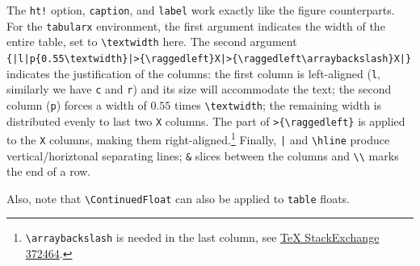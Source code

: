 The \verb|ht!| option, \verb|caption|, and \verb|label| work exactly like the figure counterparts. For the \verb|tabularx| environment, the first argument indicates the width of the entire table, set to \texttt{\textbackslash textwidth} here. The second argument \texttt{\{|l|p\{0.55\textbackslash textwidth\allowbreak\}|>\{\textbackslash raggedleft\}X|>\{\textbackslash raggedleft\textbackslash arraybackslash\}X|\}} indicates the justification of the columns: the first column is left-aligned (\verb|l|, similarly we have \verb|c| and \verb|r|) and its size will accommodate the text; the second column (\verb|p|) forces a width of $0.55$ times \texttt{\textbackslash textwidth}; the remaining width is distributed evenly to last two \verb|X| columns. The part of \texttt{>\{\textbackslash raggedleft\}} is applied to the \verb|X| columns, making them right-aligned.\footnote{\texttt{\textbackslash arraybackslash} is needed in the last column, see \href{https://tex.stackexchange.com/questions/372464/last-tabularx-column-raggedright-with-memoir}{\TeX{} StackExchange 372464}.} Finally, \texttt{|} and \texttt{\textbackslash hline} produce vertical/horiztonal separating lines; \texttt{\&} slices between the columns and \texttt{\textbackslash\textbackslash} marks the end of a row.

Also, note that \texttt{\textbackslash ContinuedFloat} can also be applied to \texttt{table} floats.

